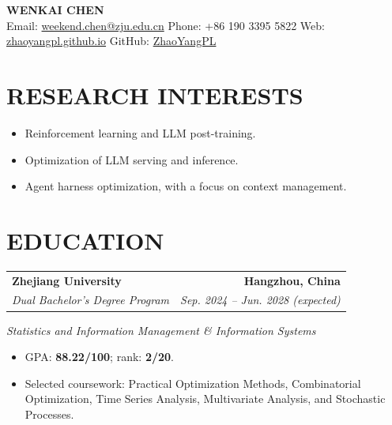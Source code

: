 \documentclass[10pt,letterpaper]{article}
\makeatletter
\newcommand{\entry}[4]{%
  \begin{tabularx}{\textwidth}{@{}Xr@{}}
    \textbf{#1} & \textbf{#2} \\[1pt]
    \textit{#3} & \textit{#4}
  \end{tabularx}\par\nobreak\vspace{4pt}
}
\makeatother
\begin{document}
\fontsize{10.5pt}{12.7pt}\selectfont

\begin{center}
  {\LARGE\bfseries WENKAI CHEN}\\[3pt]
  \small
  Email: \href{mailto:weekend.chen@zju.edu.cn}{weekend.chen@zju.edu.cn}
  \quad\textbar\quad
  Phone: +86 190 3395 5822
  \quad\textbar\quad
  Web: \href{https://zhaoyangpl.github.io}{zhaoyangpl.github.io}
  \quad\textbar\quad
  GitHub: \href{https://github.com/ZhaoYangPL}{ZhaoYangPL}
\end{center}
\vspace{-8pt}

\section*{RESEARCH INTERESTS}
\begin{itemize}[itemsep=0pt,topsep=1pt]
  \item Reinforcement learning and LLM post-training.
  \item Optimization of LLM serving and inference.
  \item Agent harness optimization, with a focus on context management.
\end{itemize}

\section*{EDUCATION}
\entry{Zhejiang University}{Hangzhou, China}{Dual Bachelor's Degree Program}{Sep. 2024 -- Jun. 2028 (expected)}
\par\textit{Statistics and Information Management \& Information Systems}\par
\begin{itemize}
  \item GPA: \textbf{88.22/100}; rank: \textbf{2/20}.
  \item Selected coursework: Practical Optimization Methods, Combinatorial Optimization, Time Series Analysis, Multivariate Analysis, and Stochastic Processes.
\end{itemize}
\end{document}
